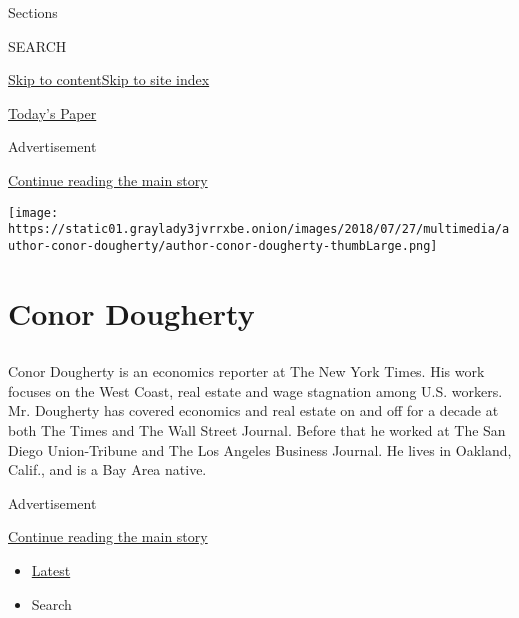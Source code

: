 Sections

SEARCH

\protect\hyperlink{site-content}{Skip to
content}\protect\hyperlink{site-index}{Skip to site index}

\href{https://myaccount.nytimes3xbfgragh.onion/auth/login?response_type=cookie\&client_id=vi}{}

\href{https://www.nytimes3xbfgragh.onion/section/todayspaper}{Today's
Paper}

Advertisement

\protect\hyperlink{after-top}{Continue reading the main story}

\texttt{[image: https://static01.graylady3jvrrxbe.onion/images/2018/07/27/multimedia/author-conor-dougherty/author-conor-dougherty-thumbLarge.png]}

\hypertarget{conor-dougherty}{%
\section{Conor Dougherty}\label{conor-dougherty}}

\hypertarget{section}{%
\subsection{}\label{section}}

Conor Dougherty is an economics reporter at The New York Times. His work
focuses on the West Coast, real estate and wage stagnation among U.S.
workers. Mr. Dougherty has covered economics and real estate on and off
for a decade at both The Times and The Wall Street Journal. Before that
he worked at The San Diego Union-Tribune and The Los Angeles Business
Journal. He lives in Oakland, Calif., and is a Bay Area native.

Advertisement

\protect\hyperlink{after-mid1}{Continue reading the main story}

\begin{itemize}
\tightlist
\item
  \protect\hyperlink{stream-panel}{Latest}
\item
  Search
\end{itemize}

